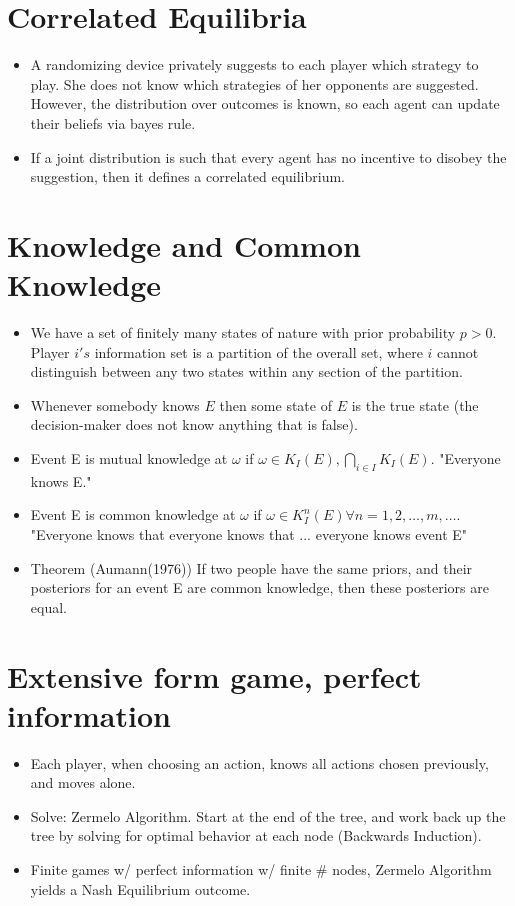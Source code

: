 \documentclass[11pt]{article} %
\begin{document}
\section{Correlated Equilibria}
\begin{itemize}
\item A randomizing device privately suggests to each player which strategy to play. She does not know which strategies of her opponents are suggested. However, the distribution over outcomes is known, so each agent can update their beliefs via bayes rule.
\item If a joint distribution is such that every agent has no incentive to disobey the suggestion, then it defines a correlated equilibrium.
\end{itemize}
\section{Knowledge and Common Knowledge}
\begin{itemize}
\item We have a set of finitely many states of nature with prior probability $p>0$. Player $i's$ information set is a partition of the overall set, where $i$ cannot distinguish between any two states within any section of the partition. 
\item Whenever somebody knows $E$ then some state of $E$ is the true state (the decision-maker does not know anything that is false).
\item Event E is mutual knowledge at $\omega$ if $\omega \in K_I(E), \bigcap_{i\in I} K_I(E). $ "Everyone knows E."
\item Event E is common knowledge at $\omega$ if $\omega \in K_I^n(E) \forall n = 1,2,\dots,m,\dots$. "Everyone knows that everyone knows that ... everyone knows event E"
\item Theorem (Aumann(1976)) If two people have the same priors, and their posteriors for an event E are common knowledge, then these posteriors are equal.
\end{itemize}
\section{Extensive form game, perfect information}
\begin{itemize}
\item Each player, when choosing an action, knows all actions chosen previously, and moves alone.
\item Solve: Zermelo Algorithm. Start at the end of the tree, and work back up the tree by solving for optimal behavior at each node (Backwards Induction). \
\item Finite games w/ perfect information w/ finite \# nodes, Zermelo Algorithm yields a Nash Equilibrium outcome.
\end{itemize}
\end{document}
